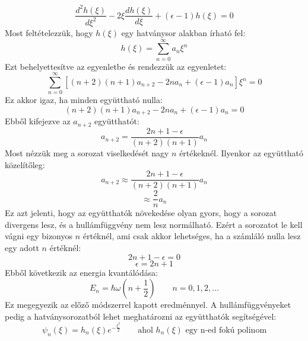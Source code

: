 \documentclass[../main.tex]{subfiles}
\begin{document}
\begin{equation}
    \frac{d^2 h(\xi)}{d \xi^2} - 2 \xi \frac{d h(\xi)}{d \xi} + (\epsilon - 1) h(\xi) = 0
\end{equation}
Most feltételezzük, hogy $h(\xi)$ egy hatványsor alakban írható fel:
\begin{equation}
    h(\xi) = \sum_{n=0}^{\infty} a_n \xi^n
\end{equation}
Ezt behelyettesítve az egyenletbe és rendezzük az egyenletet:
\begin{equation}
    \sum_{n=0}^{\infty} \left[ (n+2)(n+1) a_{n+2} - 2 n a_n + (\epsilon - 1) a_n \right] \xi^n = 0
\end{equation}
Ez akkor igaz, ha minden együttható nulla:
\begin{equation}
    (n+2)(n+1) a_{n+2} - 2 n a_n + (\epsilon - 1) a_n = 0
\end{equation}
Ebből kifejezve az $a_{n+2}$ együtthatót:
\begin{equation}
    a_{n+2} = \frac{2 n + 1 - \epsilon}{(n+2)(n+1)} a_n
\end{equation}
Most nézzük meg a sorozat viselkedését nagy $n$ értékeknél. Ilyenkor az együttható közelítőleg:
\begin{equation}
    a_{n+2} \approx \frac{2 n + 1 - \epsilon}{(n+2)(n+1)} a_n
\end{equation}
\begin{equation}
    \approx \frac{2}{n} a_n
\end{equation}
Ez azt jelenti, hogy az együtthatók növekedése olyan gyors, hogy a sorozat divergens lesz, és a hullámfüggvény nem lesz normálható. Ezért a sorozatot le kell vágni egy bizonyos $n$ értéknél, ami csak akkor lehetséges, ha a számláló nulla lesz egy adott $n$ értéknél:
\begin{equation}
    2 n + 1 - \epsilon = 0
\end{equation}
\begin{equation}
    \epsilon = 2 n + 1
\end{equation}
Ebből következik az energia kvantálódása:
\begin{equation}
    E_n = \hbar \omega \left( n + \frac{1}{2} \right) \quad \quad n = 0, 1, 2, \ldots
\end{equation}
Ez megegyezik az előző módszerrel kapott eredménnyel. A hullámfüggvényeket pedig a hatványsorozatból lehet meghatározni az együtthatók segítségével:
\begin{equation}
    \psi_n(\xi) = h_n(\xi) e^{- \frac{\xi^2}{2}} \quad \quad \text{ahol } h_n(\xi) \text{ egy n-ed fokú polinom}
\end{equation}
\end{document}
